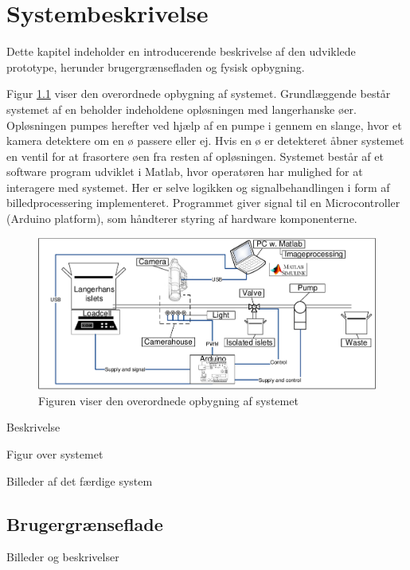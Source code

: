 \chapter{Systembeskrivelse}
Dette kapitel indeholder en introducerende beskrivelse af den udviklede prototype, herunder brugergrænsefladen og fysisk opbygning.

Figur \ref{fig:system} viser den overordnede opbygning af systemet. Grundlæggende består systemet af en beholder indeholdene opløsningen med langerhanske øer. Opløsningen pumpes herefter ved hjælp af en pumpe i gennem en slange, hvor et kamera detektere om en ø passere eller ej. Hvis en ø er detekteret åbner systemet en ventil for at frasortere øen fra resten af opløsningen. Systemet består af et software program udviklet i Matlab, hvor operatøren har mulighed for at interagere med systemet. Her er selve logikken og signalbehandlingen i form af billedprocessering implementeret. Programmet giver signal til en Microcontroller (Arduino platform), som håndterer styring af hardware komponenterne.

\begin{figure}[H]
	\centering
	\includegraphics[width=1\textwidth]{billeder/DMTS.pdf}
	\caption{Figuren viser den overordnede opbygning af systemet}
	\label{fig:system}
\end{figure}
Beskrivelse 

Figur over systemet

Billeder af det færdige system

\section{Brugergrænseflade}
Billeder og beskrivelser


